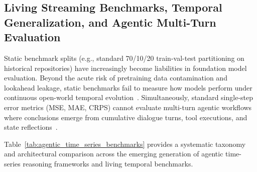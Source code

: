 \subsection{Living Streaming Benchmarks, Temporal Generalization, and Agentic Multi-Turn Evaluation}
\label{sec:living_streaming_agentic_benchmarks}

Static benchmark splits (e.g., standard 70/10/20 train-val-test partitioning on historical repositories) have increasingly become liabilities in foundation model evaluation. Beyond the acute risk of pretraining data contamination and lookahead leakage, static benchmarks fail to measure how models perform under continuous open-world temporal evolution~\cite{garza2026impermanent}. Simultaneously, standard single-step error metrics (MSE, MAE, CRPS) cannot evaluate multi-turn agentic workflows where conclusions emerge from cumulative dialogue turns, tool executions, and state reflections~\cite{kong2026timesagemt}.

Table~\ref{tab:agentic_time_series_benchmarks} provides a systematic taxonomy and architectural comparison across the emerging generation of agentic time-series reasoning frameworks and living temporal benchmarks.

